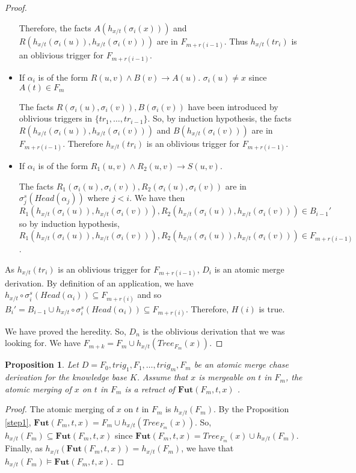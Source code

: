 \documentclass{article}
\newtheorem{proposition}{Proposition}[section]
\theoremstyle{definition}
\theoremstyle{remark}
\newcommand{\Tree}{\textit{Tree}}
\newcommand{\Fut}{\textbf{Fut}}
\begin{document}
\begin{proof}
\begin{itemize}
Therefore, the facts $A(h_{x/t}(\sigma_i(x)))$ and $R(h_{x/t}(\sigma_i(u)),h_{x/t}(\sigma_i(v)))$ are in $ F_{m+r(i-1)}$. Thus $h_{x/t}(tr_{i})$ is an oblivious trigger for $F_{m+r(i-1)}$.
\item If $\alpha_i$ is of the form $R(u,v) \wedge B(v) \rightarrow A(u)$. $\sigma_i(u) \neq x$ since $A(t) \in F_{m}$

The facts $R(\sigma_i(u),\sigma_i(v)),B(\sigma_i(v))$ have been introduced by oblivious triggers in $\{tr_1,\ldots,tr_{i-1}\}$. So, by induction hypothesis, the facts $R(h_{x/t}(\sigma_i(u)),h_{x/t}(\sigma_i(v)))$ and $B(h_{x/t}(\sigma_i(v)))$ are in $ F_{m+r(i-1)}$. Therefore $h_{x/t}(tr_{i})$ is an oblivious trigger for $F_{m+r(i-1)}$.
\item If $\alpha_i$ is of the form $R_1(u,v) \wedge R_2(u,v) \rightarrow S(u,v)$.

The facts $R_1(\sigma_i(u),\sigma_i(v)),R_2(\sigma_i(u),\sigma_i(v))$ are in $\sigma_j^s(Head(\alpha_j))$ where $j<i$. We have then $R_1(h_{x/t}(\sigma_i(u)),h_{x/t}(\sigma_i(v))),R_2(h_{x/t}(\sigma_i(u)),h_{x/t}(\sigma_i(v)))\in B_{i-1}'$ so by induction hypothesis, $R_1(h_{x/t}(\sigma_i(u)),h_{x/t}(\sigma_i(v))),R_2(h_{x/t}(\sigma_i(u)),h_{x/t}(\sigma_i(v)))\in F_{m+r(i-1)}$. 



	\end{itemize} 

As $h_{x/t}(tr_{i})$ is an oblivious trigger for $F_{m+r(i-1)}$, $D_i$ is an atomic merge derivation. By definition of an application, we have $h_{x/t} \circ \sigma_i^s(Head(\alpha_i)) \subseteq F_{m+r(i)}$ and so $B_i' = B_{i-1} \cup h_{x/t} \circ \sigma_i^s(Head(\alpha_i)) 	\subseteq F_{m+r(i)}$.
Therefore, $H(i)$ is true.


We have proved the heredity. So, $D_n$ is the oblivious derivation that we was looking for. We have $F_{m+k} = F_m \cup h_{x/t}(\Tree_{F_m}(x))$.

\end{proof}




\begin{proposition} \label{step2}
Let $D = F_0,trig_1,F_1,\ldots, trig_m,F_m$ be an atomic merge chase derivation for the knowledge base $K$. Assume that $x$ is mergeable on $t$ in $F_m$, the atomic merging of $x$ on $t$ in $F_m$ is a retract of $\Fut(F_m,t,x)$ .
\end{proposition}

\begin{proof}
The atomic merging of $x$ on $t$ in $F_m$ is $h_{x/t}(F_m)$. By the Proposition \ref{step1}, $\Fut(F_m,t,x)= F_m \cup h_{x/t}(\Tree_{F_m}(x))$. So, $h_{x/t}(F_m) \subseteq \Fut(F_m,t,x) $ since $\Fut(F_m,t,x) = \Tree_{F_m}(x) \cup h_{x/t}(F_m)$. Finally, as $h_{x/t}(\Fut(F_m,t,x)) = h_{x/t}(F_m)$, we have that $h_{x/t}(F_m) \models \Fut(F_m,t,x)$.
\end{proof}
\end{document}

